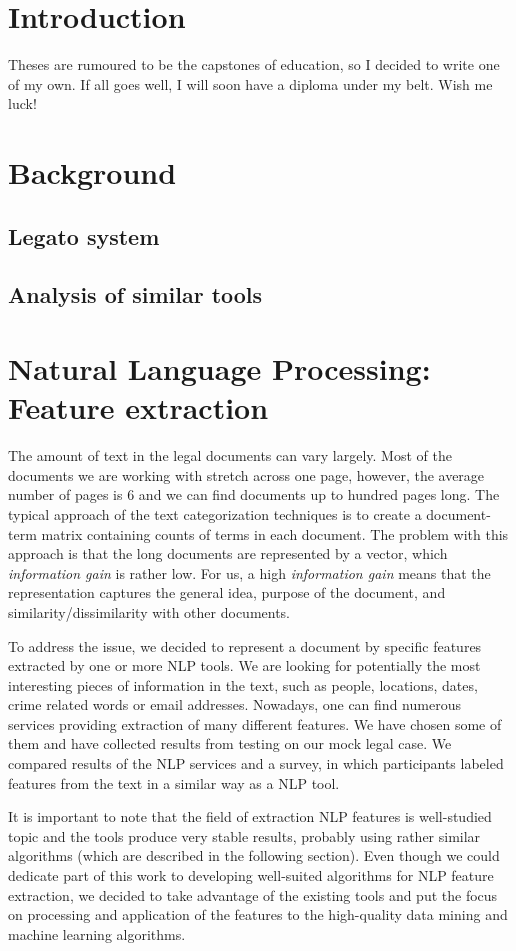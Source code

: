 \documentclass[
  digital, %
  table,   %
  lof,     %
  lot,     %
]{fithesis3}
\begin{document}
\chapter*{Introduction}

Theses are rumoured to be the capstones of education, so I decided
to write one of my own. If all goes well, I will soon have a
diploma under my belt. Wish me luck!

\chapter{Background}
\section{Legato system}
\section{Analysis of similar tools}
\chapter{Natural Language Processing: Feature extraction}
The amount of text in the legal documents can vary largely.
Most of the documents we are working with stretch across one page, however, the average number of pages is 6 and we can find documents up to hundred pages long.
The typical approach of the text categorization techniques is to create a document-term matrix containing counts of terms in each document.
The problem with this approach is that the long documents are represented by a vector, which \emph{information gain} is rather low.
For us, a high \emph{information gain} means that the representation captures the general idea, purpose of the document, and similarity/dissimilarity with other documents.

To address the issue, we decided to represent a document by specific features extracted by one or more NLP tools.
We are looking for potentially the most interesting pieces of information in the text, such as people, locations, dates, crime related words or email addresses.
Nowadays, one can find numerous services providing extraction of many different features.
We have chosen some of them and have collected results from testing on our mock legal case.
We compared results of the NLP services and a survey, in which participants labeled features from the text in a similar way as a NLP tool.

It is important to note that the field of extraction NLP features is well-studied topic and the tools produce very stable results, probably using rather similar algorithms (which are described in the following section). Even though we could dedicate part of this work to developing well-suited algorithms for NLP feature extraction, we decided to take advantage of the existing tools and put the focus on processing and application of the features to the high-quality data mining and machine learning algorithms. 
\end{document}

